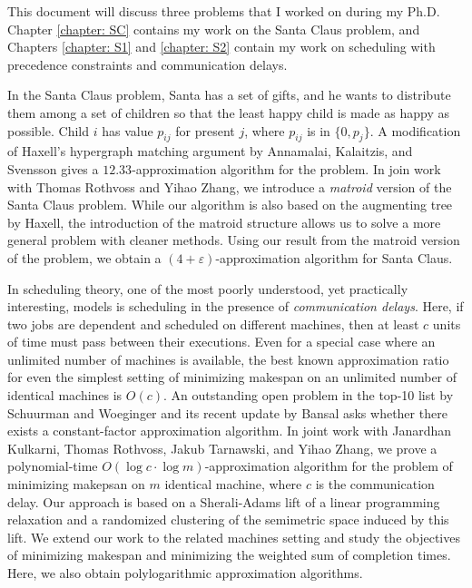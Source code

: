 
This document will discuss three problems that I worked on during my Ph.D. 
Chapter \ref{chapter: SC} contains my work on the Santa Claus problem, and
 Chapters \ref{chapter: S1} and \ref{chapter: S2} contain my work on scheduling with precedence constraints and communication delays.

In the Santa Claus problem, Santa has a set of gifts, and he wants to distribute them among a set of children
so that the least happy child is made as happy as possible. 
Child $i$ has value $p_{ij}$ for present $j$, where $p_{ij}$ is in $ \{ 0,p_j\}$.
A modification of Haxell's hypergraph matching argument by Annamalai, Kalaitzis, and Svensson gives a $12.33$-approximation algorithm for the problem.
In join work with Thomas Rothvoss and Yihao Zhang, we introduce a \emph{matroid} version of the Santa Claus problem. 
While our algorithm is also based on the augmenting tree by Haxell, the introduction
of the matroid structure allows us to solve a more general problem with cleaner methods.
Using our result from the matroid version of the problem, we obtain a $(4+\varepsilon)$-approximation algorithm for Santa Claus.

In scheduling theory, one of the most poorly understood, yet practically interesting, models is scheduling
in the presence of \emph{communication delays}.
Here,
if two jobs are dependent and scheduled on different machines,
then at least $c$ units of time must pass between their executions.
Even for a special case where an unlimited number of machines is available, the best known approximation ratio
for even the simplest setting of minimizing makespan on an unlimited number of identical machines is $O(c)$.
An outstanding open problem in the top-10 list by Schuurman and Woeginger and its recent update by Bansal
asks whether there exists a constant-factor approximation algorithm.
In joint work with Janardhan Kulkarni, Thomas Rothvoss, Jakub Tarnawski, and Yihao Zhang,
 we prove a polynomial-time $O(\log c \cdot \log m)$-approximation algorithm
for the problem of minimizing makepsan
on $m$ identical machine, where $c$ is the communication delay.
Our approach is based on a Sherali-Adams lift of a linear programming relaxation
and a randomized clustering of the semimetric space induced by this lift. 
We extend our work to the related machines setting and study the objectives of minimizing makespan 
and minimizing the weighted sum of completion times. 
Here, we also obtain polylogarithmic approximation algorithms.